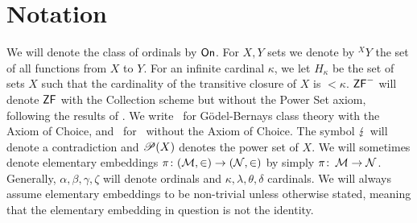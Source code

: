 \documentclass[../main]{subfiles}
\begin{document}
\chapter{Notation}
\thispagestyle{fancy}

\setlength{\parindent}{18pt}
\begin{onehalfspacing}

We will denote the class of ordinals by $\textsf{On}$. For $X,Y$ sets we denote by ${^X}Y$ the set of all functions from $X$ to $Y$. For an infinite cardinal $\kappa$, we let $H_\kappa$ be the set of sets $X$ such that the cardinality of the transitive closure of $X$ is ${<}\kappa$. $\textsf{ZF}^-$ will denote $\textsf{ZF}$ with the Collection scheme but without the Power Set axiom, following the results of \cite{ZFwithoutPowerSet}. We write \gbc\ for G\"odel-Bernays class theory with the Axiom of Choice, and \gb\ for \gbc\ without the Axiom of Choice. The symbol $\operatorname{\lightning}$ will denote a contradiction and $\mathscr P(X)$ denotes the power set of $X$. We will sometimes denote elementary embeddings $\pi\colon(\operatorname{\mathcal M},\in)\to(\operatorname{\mathcal N},\in)$ by simply $\pi\colon\operatorname{\mathcal M}\to\operatorname{\mathcal N}$. Generally, $\alpha,\beta,\gamma,\zeta$ will denote ordinals and $\kappa,\lambda,\theta,\delta$ cardinals. We will always assume elementary embeddings to be non-trivial unless otherwise stated, meaning that the elementary embedding in question is not the identity.


\end{onehalfspacing}
\setlength{\parindent}{0pt}
\end{document}
